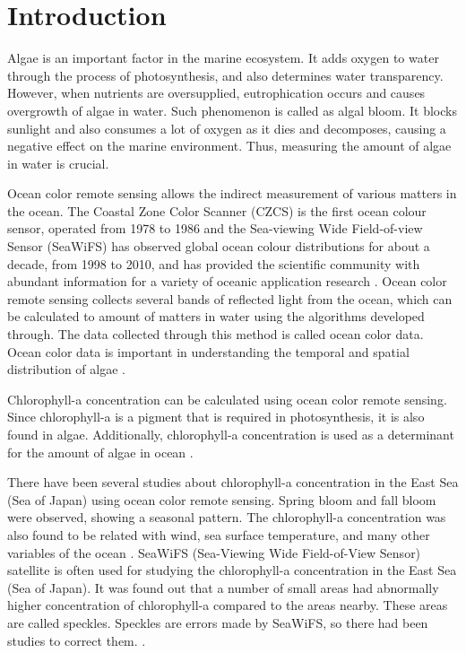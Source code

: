 \section{Introduction}

Algae is an important factor in the marine ecosystem. It adds oxygen to water through the process of photosynthesis, and also determines water transparency. However, when nutrients are oversupplied, eutrophication occurs and causes overgrowth of algae in water. Such phenomenon is called as algal bloom. It blocks sunlight and also consumes a lot of oxygen as it dies and decomposes, causing a negative effect on the marine environment. Thus, measuring the amount of algae in water is crucial.

Ocean color remote sensing allows the indirect measurement of various matters in the ocean. The Coastal Zone Color Scanner (CZCS) is the first ocean colour sensor, operated from 1978 to 1986 and the Sea-viewing Wide Field-of-view Sensor (SeaWiFS) has observed global ocean colour distributions for about a decade, from 1998 to 2010, and has provided the scientific community with abundant information for a variety of oceanic application research \cite{kyung2013characteristics, hooker1992An}. Ocean color remote sensing collects several bands of reflected light from the ocean, which can be calculated to amount of matters in water using the algorithms developed through. The data collected through this method is called ocean color data. Ocean color data is important in understanding the temporal and spatial distribution of algae \cite{kimhc2016surface}.

Chlorophyll-a concentration can be calculated using ocean color remote sensing. Since chlorophyll-a is a pigment that is required in photosynthesis, it is also found in algae. Additionally, chlorophyll-a concentration is used as a determinant for the amount of algae in ocean \cite{o2000ocean}. 

There have been several studies about chlorophyll-a concentration in the East Sea (Sea of Japan) using ocean color remote sensing. Spring bloom and fall bloom were observed, showing a seasonal pattern. The chlorophyll-a concentration was also found to be related with wind, sea surface temperature, and many other variables of the ocean \cite{yamada2004seasonal}. SeaWiFS (Sea-Viewing Wide Field-of-View Sensor) satellite is often used for studying the chlorophyll-a concentration in the East Sea (Sea of Japan). It was found out that a number of small areas had abnormally higher concentration of chlorophyll-a compared to the areas nearby. These areas are called speckles. Speckles are errors made by SeaWiFS, so there had been studies to correct them. \cite{chae2009characteristics}. 

